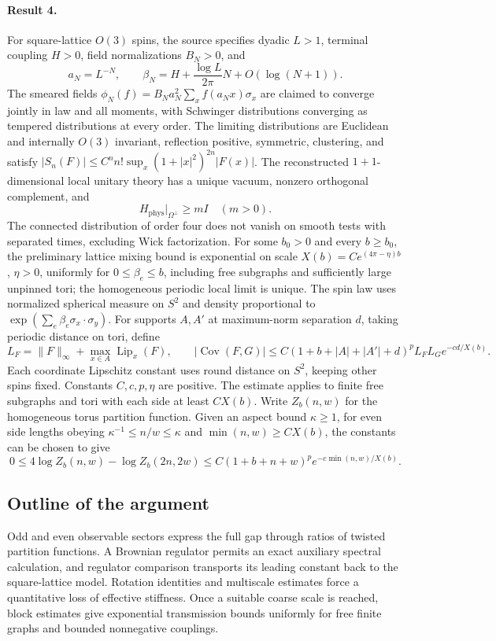 \documentclass[11pt]{article}
\begin{document}
\paragraph{Result 4.} For square-lattice \(O(3)\) spins, the source specifies dyadic \(L>1\), terminal coupling \(H>0\), field normalizations \(B_N>0\), and
\[
 a_N=L^{-N},\qquad\beta_N=H+\frac{\log L}{2\pi}N+O(\log(N+1)).
\]
The smeared fields \(\phi_N(f)=B_Na_N^2\sum_x f(a_Nx)\sigma_x\) are claimed to converge jointly in law and all moments, with Schwinger distributions converging as tempered distributions at every order. The limiting distributions are Euclidean and internally \(O(3)\) invariant, reflection positive, symmetric, clustering, and satisfy \(|S_n(F)|\le C^nn!\sup_x(1+|x|^2)^{2n}|F(x)|\). The reconstructed \(1+1\)-dimensional local unitary theory has a unique vacuum, nonzero orthogonal complement, and
\[
 H_{\mathrm{phys}}|_{\Omega^\perp}\ge mI\quad(m>0).
\]
The connected distribution of order four does not vanish on smooth tests with separated times, excluding Wick factorization. For some $b_0>0$ and every $b\ge b_0$, the preliminary lattice mixing bound is exponential on scale \(X(b)=Ce^{(4\pi-\eta)b}\), \(\eta>0\), uniformly for \(0\le\beta_e\le b\), including free subgraphs and sufficiently large unpinned tori; the homogeneous periodic local limit is unique. The spin law uses normalized spherical measure on $S^2$ and density proportional to $\exp(\sum_e\beta_e\sigma_x\cdot\sigma_y)$. For supports $A,A'$ at maximum-norm separation $d$, taking periodic distance on tori, define
\[
 L_F=\|F\|_\infty+\max_{x\in A}\operatorname{Lip}_x(F),\qquad
 |\operatorname{Cov}(F,G)|\le C(1+b+|A|+|A'|+d)^p L_FL_G e^{-cd/X(b)}.
\]
Each coordinate Lipschitz constant uses round distance on $S^2$, keeping other spins fixed. Constants $C,c,p,\eta$ are positive. The estimate applies to finite free subgraphs and tori with each side at least $CX(b)$. Write $Z_b(n,w)$ for the homogeneous torus partition function. Given an aspect bound $\kappa\ge1$, for even side lengths obeying $\kappa^{-1}\le n/w\le\kappa$ and $\min(n,w)\ge CX(b)$, the constants can be chosen to give
\[
 0\le4\log Z_b(n,w)-\log Z_b(2n,2w)\le C(1+b+n+w)^p e^{-c\min(n,w)/X(b)}.
\]

\subsection{Outline of the argument}
Odd and even observable sectors express the full gap through ratios of twisted partition functions. A Brownian regulator permits an exact auxiliary spectral calculation, and regulator comparison transports its leading constant back to the square-lattice model. Rotation identities and multiscale estimates force a quantitative loss of effective stiffness. Once a suitable coarse scale is reached, block estimates give exponential transmission bounds uniformly for free finite graphs and bounded nonnegative couplings.
\end{document}

